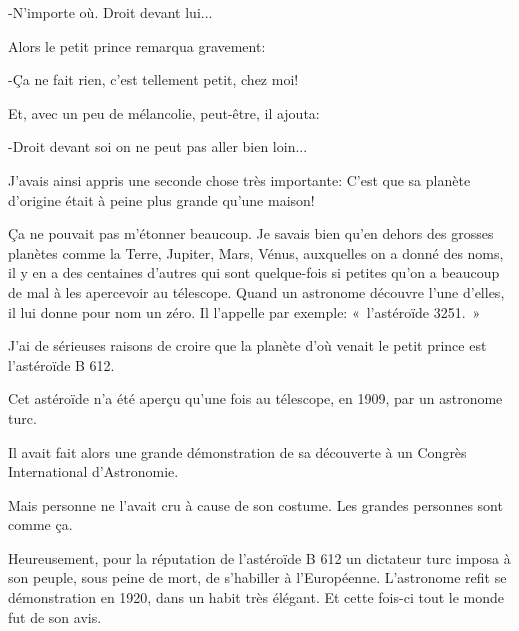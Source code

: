 \documentclass{report}
\begin{document}
-N'importe où. Droit devant lui... 

Alors le petit prince remarqua gravement:

-Ça ne fait rien, c'est tellement petit, chez moi! 

Et, avec un peu de mélancolie, peut-être, il ajouta: 

-Droit devant soi on ne peut pas aller bien loin...

J'avais ainsi appris une seconde chose très importante: C'est que sa planète d'origine était à peine plus grande qu'une maison!

Ça ne pouvait pas m'étonner beaucoup. Je savais bien qu'en dehors des grosses planètes comme la Terre, Jupiter, Mars, Vénus, auxquelles on a donné des noms, il y en a des centaines d'autres qui sont quelque-fois si petites qu'on a beaucoup de mal à les apercevoir au télescope. Quand un astronome découvre l'une d'elles, il lui donne pour nom un zéro. Il l'appelle par exemple: «~l'astéroïde 3251.~»

J'ai de sérieuses raisons de croire que la planète d'où venait le petit prince est l'astéroïde B 612.

Cet astéroïde n'a été aperçu qu'une fois au télescope, en 1909, par un astronome turc.


Il avait fait alors une grande démonstration de sa découverte à un Congrès International d'Astronomie. 

Mais personne ne l'avait cru à cause de son costume. Les grandes personnes sont comme ça.


Heureusement, pour la réputation de l'astéroïde B 612 un dictateur turc imposa à son peuple, sous peine de mort, de s'habiller à l'Européenne. L'astronome refit se démonstration en 1920, dans un habit très élégant. Et cette fois-ci tout le monde fut de son avis.

\end{document}
